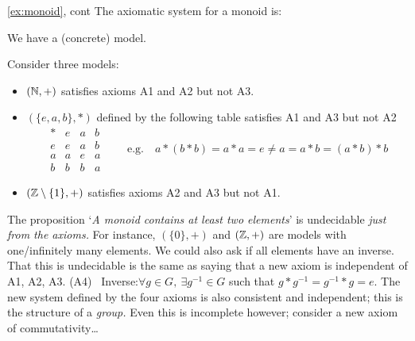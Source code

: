 \begin{example*}{\ref{ex:monoid}, cont}{}
The axiomatic system for a monoid is:
\begin{description}\itemsep0pt
	\item[\normalfont\emph{Consistent}] We have a (concrete) model.
	\item[\normalfont\emph{Independent}] Consider three models:
	\begin{itemize}\itemsep0pt
	  \item $(\mathbb{N},+)$ satisfies axioms A1 and A2 but not A3.
	  \item $(\{e,a,b\},*)$ defined by the following table satisfies A1 and A3 but not A2
	  \[\begin{array}{c||ccc}
	  *&e&a&b\\\hline\hline
	  e&e&a&b\\
	  a&a&e&a\\
	  b&b&b&a
	  \end{array} \qquad \text{e.g.}\quad a*(b*b)=a*a=e\neq a=a*b=(a*b)*b\]
	  \item $(\mathbb{Z}\setminus\{1\},+)$ satisfies axioms A2 and A3 but not A1.
	\end{itemize}
	\item[\normalfont\emph{Incomplete}] The proposition `\emph{A monoid contains at least two elements}' is undecidable \emph{just from the axioms.} For instance, $(\{0\},+)$ and $(\mathbb{Z},+)$ are models with one/infinitely many elements.\smallbreak
	  We could also ask if all elements have an inverse. That this is undecidable is the same as saying that a new axiom is independent of A1, A2, A3.\smallbreak
	  \lstsp\lstsp\lstsp(A4) \ Inverse:\quad $\forall g\in G,\ \exists g^{-1}\in G$ such that $g\ast g^{-1}=g^{-1}\ast g=e$.\smallbreak
	The new system defined by the four axioms is also consistent and independent; this is the structure of a \emph{group.} Even this is incomplete however; consider a new axiom of commutativity\ldots
\end{description} 
\end{example*}

\goodbreak

